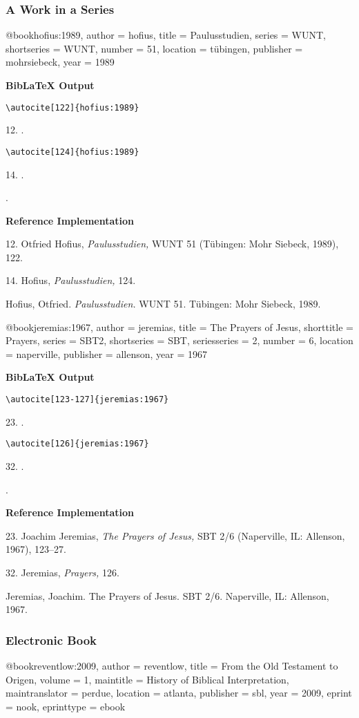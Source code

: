 \documentclass[a4paper]{article}
\newcommand\citetest[5]{%
  {\textbf{BibLaTeX Output}\par
   \nobreak
   \texttt{\textbackslash autocite[#2]\{#5\}}\par
   \color{biblatex-colour}
   #1. \cite[#2]{#5}.\par
   \color{black}
   \texttt{\textbackslash autocite[#4]\{#5\}}\par
   \color{biblatex-colour}
   #3. \cite[#4]{#5}.\par
   \hangindent\bibindent\bibentrycite{#5}.\par}}
\newenvironment{refimp}{%
  \begin{minipage}{\linewidth}
    \setlength{\parskip}{1ex}
    \textbf{Reference Implementation}\par
    \nobreak
    \color{reference-colour}
}{\end{minipage}}
\newenvironment{vb}{%
  \setlength{\parskip}{0pt}
  \verbatim}{\endverbatim}
\begin{document}
\subsubsection{A Work in a Series}

\begin{vb}
@book{hofius:1989,
  author = hofius,
  title = {Paulusstudien},
  series = WUNT,
  shortseries = {WUNT},
  number = {51},
  location = tübingen,
  publisher = mohrsiebeck,
  year = {1989}
}
\end{vb}  

\citetest{12}{122}{14}{124}{hofius:1989}

\begin{refimp}
  12. Otfried Hofius, \emph{Paulusstudien,} WUNT 51 (Tübingen: Mohr Siebeck,
  1989), 122.

  14. Hofius, \emph{Paulusstudien,} 124.

  Hofius, Otfried. \emph{Paulusstudien.} WUNT 51. Tübingen: Mohr Siebeck,
  1989.
\end{refimp}

\begin{vb}
@book{jeremias:1967,
  author = jeremias,
  title = {The Prayers of Jesus},
  shorttitle = {Prayers},
  series = SBT2,
  shortseries = {SBT},
  seriesseries = {2},
  number = {6},
  location = naperville,
  publisher = allenson,
  year = {1967}
}
\end{vb}

\citetest{23}{123-127}{32}{126}{jeremias:1967}

\begin{refimp}
  23. Joachim Jeremias, \emph{The Prayers of Jesus,} SBT 2/6 (Naperville, IL:
  Allenson, 1967), 123–27.

  32. Jeremias, \emph{Prayers,} 126.

  \hangindent\bibindent Jeremias, Joachim. The Prayers of Jesus. SBT 2/6.
  Naperville, IL: Allenson, 1967.
\end{refimp}

\subsubsection{Electronic Book}

\begin{vb}
@book{reventlow:2009,
  author = reventlow,
  title = {From the Old Testament to Origen},
  volume = {1},
  maintitle = {History of Biblical Interpretation},
  maintranslator = perdue,
  location = atlanta,
  publisher = sbl,
  year = 2009,
  eprint = nook,
  eprinttype = {ebook}
}
\end{vb}
\end{document}
